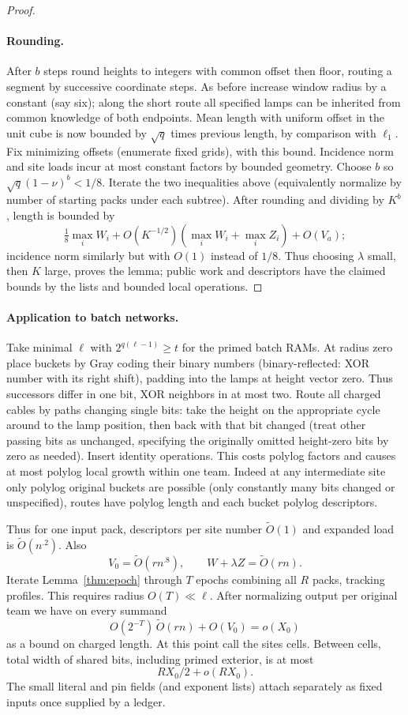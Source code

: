 \documentclass[11pt,letterpaper]{article}
\theoremstyle{definition}
\numberwithin{equation}{section}
\begin{document}
\begin{proof}
\paragraph{Rounding.}
After $b$ steps round heights to integers with common offset then floor, routing
a segment by successive coordinate steps. As before increase window radius by a constant
(say six); along the short route all specified lamps can be inherited from common knowledge
of both endpoints. Mean length with uniform offset in the unit cube is now bounded by $\sqrt{q}$
times previous length, by comparison with $\ell_1$. Fix minimizing offsets (enumerate fixed grids),
with this bound. Incidence norm and site loads incur at most constant factors by bounded
geometry. Choose $b$ so $\sqrt{q}(1-\nu)^b<1/8$. Iterate the two inequalities above (equivalently
normalize by number of starting packs under each subtree). After rounding and dividing by
$K^b$, length is bounded by
\[
  \tfrac18\max_i W_i+ O(K^{-1/2})(\max_i W_i+\max_i Z_i) + O(V_a);
\]
incidence norm similarly but with $O(1)$ instead of $1/8$. Thus choosing $\lambda$ small, then $K$ large,
proves the lemma; public work and descriptors have the claimed bounds by the lists and
bounded local operations.
\end{proof}

\paragraph{Application to batch networks.}
Take minimal $\ell$ with $2^{q(\ell-1)}\ge t$ for the primed batch
RAMs. At radius zero place buckets by Gray coding their binary numbers (binary-reflected:
XOR number with its right shift), padding into the lamps at height vector zero. Thus
successors differ in one bit, XOR neighbors in at most two. Route all charged cables by
paths changing single bits: take the height on the appropriate cycle around to the lamp
position, then back with that bit changed (treat other passing bits as unchanged, specifying
the originally omitted height-zero bits by zero as needed). Insert identity operations. This
costs polylog factors and causes at most polylog local growth within one team. Indeed at
any intermediate site only polylog original buckets are possible (only constantly many bits
changed or unspecified), routes have polylog length and each bucket polylog descriptors.

Thus for one input pack, descriptors per site number $\widetilde{O}(1)$ and expanded load is
$\widetilde{O}(n^{.2})$.
Also
\[
  V_0=\widetilde{O}(rn^{.8}),\qquad W+\lambda Z=\widetilde{O}(rn).
\]
Iterate Lemma~\ref{thm:epoch} through $T$ epochs combining all $R$ packs, tracking profiles. This requires
radius $O(T)\ll \ell$. After normalizing output per original team we have on every summand
\[
  O(2^{-T})\,\widetilde{O}(rn)+O(V_0)=o(X_0)
\]
as a bound on charged length. At this point call the sites cells. Between cells, total width of
shared bits, including primed exterior, is at most
\begin{equation}\label{eq:intercell}
  RX_0/2+o(RX_0).
\end{equation}
The small literal and pin fields (and exponent lists) attach separately as fixed inputs once
supplied by a ledger.
\end{document}
